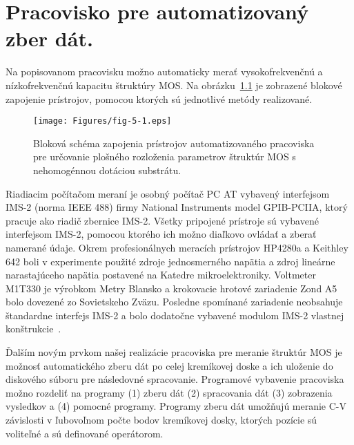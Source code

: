 
\chapter{Pracovisko pre automatizovaný zber dát.}\label{Chapter5}

Na popisovanom pracovisku možno automaticky merať vysokofrekvenčnú a
nízkofrekvenčnú kapacitu štruktúry MOS\@. Na obrázku~\ref{fig:5.1} je
zobrazené blokové zapojenie prístrojov, pomocou ktorých sú jednotlivé
metódy realizované.

\begin{figure}[h!]\centering
  \texttt{[image: Figures/fig-5-1.eps]}%
  \caption[Bloková schéma zapojenia prístrojov automatizovaného
    pracoviska]{Bloková schéma zapojenia prístrojov automatizovaného
    pracoviska pre určovanie plošného rozloženia parametrov štruktúr
    MOS s nehomogénnou dotáciou substrátu.}\label{fig:5.1}
\end{figure}

Riadiacim počítačom meraní je osobný počítač PC AT vybavený
interfejsom IMS-2 (norma IEEE 488) firmy National Instruments model
GPIB-PCIIA, ktorý pracuje ako riadič zbernice IMS-2. Všetky pripojené
prístroje sú vybavené interfejsom IMS-2, pomocou ktorého ich možno
diaľkovo ovládať a zberať namerané údaje. Okrem profesionálnych
meracích prístrojov HP4280a a Keithley 642 boli v experimente použité
zdroje jednosmerného napätia a zdroj lineárne narastajúceho napätia
postavené na Katedre mikroelektroniky. Voltmeter M1T330 je výrobkom
Metry Blansko a krokovacie hrotové zariadenie Zond A5 bolo dovezené zo
Sovietskeho Zväzu. Posledne spomínané zariadenie neobsahuje štandardne
interfejs IMS-2 a bolo dodatočne vybavené modulom IMS-2 vlastnej
konštrukcie~\cite{5.1}.

Ďalším novým prvkom našej realizácie pracoviska pre meranie štruktúr
MOS je možnosť automatického zberu dát po celej kremíkovej doske a ich
uloženie do diskového súboru pre následovné spracovanie. Programové
vybavenie pracoviska možno rozdeliť na programy (1) zberu dát (2)
spracovania dát (3) zobrazenia vysledkov a (4) pomocné
programy. Programy zberu dát umožňujú meranie C-V závislosti v
ľubovoľnom počte bodov kremíkovej dosky, ktorých pozície sú voliteľné
a sú definované operátorom.

